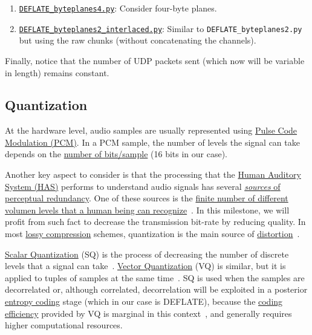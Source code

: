 \begin{enumerate}
  byte-planes. This would allow compression of
  \emph{coefficients}\footnote{Used in a future improvements of
  intercom.} that requires more than two bytes to be represented.
\item
  \href{https://github.com/Tecnologias-multimedia/InterCom/blob/master/src/DEFLATE\_byteplanes4.py}{\texttt{DEFLATE\_byteplanes4.py}}:
  Consider four-byte planes.
\item
  \href{https://github.com/Tecnologias-multimedia/InterCom/blob/master/src/DEFLATE_byteplanes2\_interlaced.py}{\texttt{DEFLATE\_byteplanes2\_interlaced.py}}:
  Similar to \verb|DEFLATE_byteplanes2.py| but using the raw chunks
  (without concatenating the channels).
\end{enumerate}

Finally, notice that the number of UDP packets sent (which now will be
variable in length) remains constant.

\subsection{Quantization}
At the hardware level, audio samples are usually represented
using \href{https://en.wikipedia.org/wiki/Pulse-code_modulation}{Pulse
  Code Modulation (PCM)}. In a PCM sample, the number of levels
the signal can take depends on the
\href{https://en.wikipedia.org/wiki/Audio_bit_depth}{number of
  bits/sample} (16 bits in our case).

Another key aspect to consider is that the processing that the
\href{https://en.wikipedia.org/wiki/Auditory_system}{Human
  Auditory System (HAS)} performs to understand audio signals has several
\href{https://en.wikipedia.org/wiki/Psychoacoustics}{\emph{sources} of
  perceptual redundancy}. One of these sources is the
\href{https://en.wikipedia.org/wiki/Equal-loudness_contour}{finite
  number of different volumen levels that a human being can
  recognize}~\cite{bosi2003intro}. In this milestone, we will profit from
such fact to decrease the transmission bit-rate by reducing
quality. In most
\href{https://en.wikipedia.org/wiki/Lossy_compression}{lossy
  compression} schemes, quantization is the main source of
\href{https://en.wikipedia.org/wiki/Distortion}{distortion}~\cite{taubman2002jpeg2000}.

\href{https://en.wikipedia.org/wiki/Quantization_(signal_processing)}{Scalar
  Quantization} (SQ) is the process of decreasing the number of
discrete levels that a signal can
take~\cite{sayood2017introduction}. \href{https://en.wikipedia.org/wiki/Vector_quantization}{Vector
  Quantization} (VQ) is similar, but it is applied to tuples of samples
at the same time~\cite{vetterli2014foundations}. SQ is used when
the samples are decorrelated or, although correlated,
decorrelation will be exploited in a posterior
\href{https://en.wikipedia.org/wiki/Entropy_encoding}{entropy coding}
stage (which in our case is DEFLATE), because the
\href{https://en.wikipedia.org/wiki/Quantization_(signal_processing)#Rate%E2%80%93distortion_optimization}{coding
  efficiency} provided by VQ is marginal in this
context~\cite{vetterli2014foundations}, and generally requires higher
computational resources.

